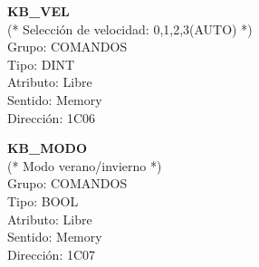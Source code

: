 \vspace{10mm}

\textbf{KB\_VEL}\\ (* Selección de velocidad: 0,1,2,3(AUTO) *)\\Grupo: COMANDOS\\Tipo: DINT\\Atributo: Libre\\Sentido: Memory\\Dirección: 1C06

\vspace{10mm}

\textbf{KB\_MODO}\\(* Modo verano/invierno *)\\Grupo: COMANDOS\\Tipo: BOOL\\Atributo: Libre\\Sentido: Memory\\Dirección: 1C07
